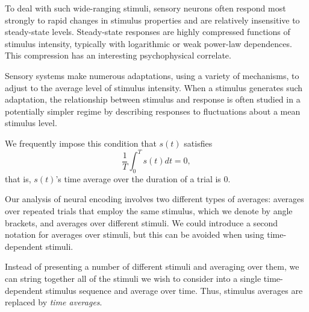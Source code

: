 \begin{exm}
  \label{exm:Steady-state responses}
  To deal with such wide-ranging 
  stimuli, sensory neurons often respond most strongly to rapid changes in stimulus properties and are relatively insensitive to steady-state levels. Steady-state responses are highly compressed functions of stimulus intensity, typically with logarithmic or weak power-law dependences. This compression has an interesting psychophysical correlate.
\end{exm}

\begin{rem}
  Sensory systems make numerous adaptations, using a variety of mechanisms, to adjust to the average level of stimulus intensity. When a stimulus generates such adaptation, the relationship between stimulus and response is often studied in a potentially simpler regime by describing responses to fluctuations about a mean stimulus level. 
\end{rem}

\begin{asm}
  \label{defn:impose-s(t)-condition}
  We frequently impose this condition that $s(t)$ satisfies
  \begin{displaymath}
    \frac{1}{T}\int_0^T s(t) dt = 0,
  \end{displaymath}
  that is, $s(t)$'s time average over the duration of a trial is 0.
\end{asm}


\begin{rem}
   Our analysis of neural encoding involves two different types of averages: averages over repeated trials that employ the same stimulus, which we denote by angle brackets, and averages over different stimuli. We could introduce a second notation for averages over stimuli, but this can be avoided when using time-dependent stimuli.
\end{rem}
\begin{defn}
  \label{defn:stimulus and time averages}
  Instead of presenting a number of different stimuli and averaging over them, we can string together all of the stimuli we wish to consider into a single time-dependent stimulus sequence and average over time. Thus, stimulus averages are replaced by \emph{time averages}.  
\end{defn}

